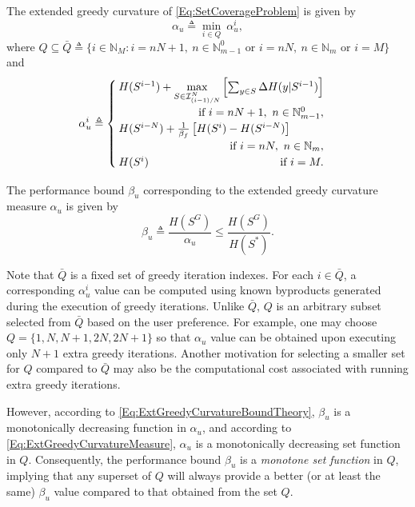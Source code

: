 \documentclass[letterpaper, 10 pt, conference]{ieeeconf}
\newcommand{\N}{\mathbb{N}}
\begin{document}
The extended greedy curvature of \eqref{Eq:SetCoverageProblem} is given by
\begin{equation}\label{Eq:ExtGreedyCurvatureMeasure}
    \alpha_u \triangleq \min_{i \in Q}\ \alpha^i_u,
\end{equation}
where $Q \subseteq \bar{Q} \triangleq \{i\in\N_M: i = nN+1,\ n\in \N_{m-1}^0 \mbox{ or } i = nN,\ n\in \N_m  \mbox{ or } i = M \}$ and  
\begin{equation}\label{Eq:UpperBoundAlphaiForfYStar}
    \alpha^i_u \triangleq 
    \begin{cases}
     H(S^{i-1}) + \underset{S\in\mathcal{I}^N_{(i-1)/N}}{\max} \left[ \sum_{y\in S} \Delta H(y \vert S^{i-1})\right]\\
     \hfill \mbox{if }i=nN+1,\ n\in\N_{m-1}^0,\\
     H(S^{i-N}) + \frac{1}{\beta_f}\left[ H(S^i) - H(S^{i-N}) \right]\\
     \hfill \mbox{if }i=nN,\ n\in\N_m,\\
     H(S^i) 
     \hfill \mbox{if }i=M. 
    \end{cases}
\end{equation}


The performance bound $\beta_u$ corresponding to the extended greedy curvature measure $\alpha_u$ is given by
\begin{equation}\label{Eq:ExtGreedyCurvatureBoundTheory}
\beta_u \triangleq \frac{H(S^G)}{\alpha_u} \leq \frac{H(S^G)}{H(S^*)}. 
\end{equation}

Note that $\bar{Q}$ is a fixed set of greedy iteration indexes. For each $i\in \bar{Q}$, a corresponding $\alpha^i_u$ value can be computed using known byproducts generated during the execution of greedy iterations. Unlike $\bar{Q}$, $Q$ is an arbitrary subset selected from $\bar{Q}$ based on the user preference. For example, one may choose $Q=\{1,N,N+1,2N,2N+1\}$ so that $\alpha_u$ value can be obtained upon executing only $N+1$ extra greedy iterations. Another motivation for selecting a smaller set for $Q$ compared to $\bar{Q}$ may also be the computational cost associated with running extra greedy iterations. 

However, according to \eqref{Eq:ExtGreedyCurvatureBoundTheory}, $\beta_u$ is a monotonically decreasing function in $\alpha_u$, and according to \eqref{Eq:ExtGreedyCurvatureMeasure}, $\alpha_u$ is a monotonically decreasing set function in $Q$. Consequently, the performance bound $\beta_u$ is a \emph{monotone set function} in $Q$, implying that any superset of $Q$ will always provide a better (or at least the same) $\beta_u$ value compared to that obtained from the set $Q$.
\end{document}
